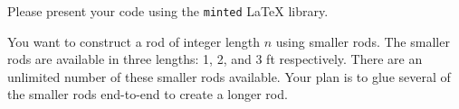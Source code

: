 \documentclass[12pt]{exam}
\newcommand{\latex}{\LaTeX\xspace}
\newcommand{\stars}[1]{%
    \foreach \n in {1,...,#1}{%
        $\filledstar$%
    }%
}
\begin{document}
\begin{questions}
    \clearpage

    \question[40] [W9, \stars{5}] Please present your code using the \texttt{minted} \latex library.

    You want to construct a rod of integer length $n$ using smaller rods. The smaller rods are available in three
    lengths: 1, 2, and 3 ft respectively. There are an unlimited number of these smaller rods available.
    Your plan is to glue several of the smaller rods end-to-end to create a longer rod.


\end{questions}
\end{document}
